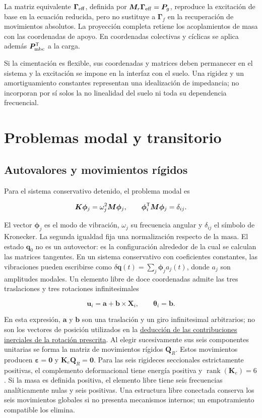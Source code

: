 La matriz equivalente $\bm\Gamma_{\rm eff}$, definida por $\bm M_r\bm\Gamma_{\rm eff}=\bm P_g$, reproduce la excitación de base en la ecuación reducida, pero no sustituye a $\bm\Gamma_f$ en la recuperación de movimientos absolutos. La proyección completa retiene los acoplamientos de masa con las coordenadas de apoyo. En coordenadas colectivas y cíclicas se aplica además $\bm P_{\rm mbc}^\mathsf T$ a la carga.

Si la cimentación es flexible, sus coordenadas y matrices deben permanecer en el sistema y la excitación se impone en la interfaz con el suelo. Una rigidez y un amortiguamiento constantes representan una idealización de impedancia; no incorporan por sí solos la no linealidad del suelo ni toda su dependencia frecuencial.



\section{Problemas modal y transitorio}
\subsection{Autovalores y movimientos rígidos}
Para el sistema conservativo detenido, el problema modal es

\begin{equation}
\bm K\bm\phi_j=\omega_j^2\bm M\bm\phi_j,\qquad
\bm\phi_i^\mathsf T\bm M\bm\phi_j=\delta_{ij}.
\end{equation}

El vector $\bm\phi_j$ es el modo de vibración, $\omega_j$ su frecuencia angular y $\delta_{ij}$ el símbolo de Kronecker. La segunda igualdad fija una normalización respecto de la masa. El estado $\bm q_0$ no es un autovector: es la configuración alrededor de la cual se calculan las matrices tangentes. En un sistema conservativo con coeficientes constantes, las vibraciones pueden escribirse como $\delta\bm q(t)=\sum_j\bm\phi_j a_j(t)$, donde $a_j$ son amplitudes modales.
Un elemento libre de doce coordenadas admite las tres traslaciones y tres rotaciones infinitesimales

\begin{equation}
\bm u_i=\bm a+\bm b\times\bm X_i,\qquad \bm\theta_i=\bm b.
\label{eq:rigid}
\end{equation}

En esta expresión, $\bm a$ y $\bm b$ son una traslación y un giro infinitesimal arbitrarios; no son los vectores de posición utilizados en la \hyperref[sec:giro]{deducción de las contribuciones inerciales de la rotación prescrita}. Al elegir sucesivamente sus seis componentes unitarias se forma la matriz de movimientos rígidos $\bm Q_R$. Estos movimientos producen $\bm\varepsilon=\bm0$ y $\bm K_e\bm Q_R=\bm0$. Para las seis rigideces seccionales estrictamente positivas, el complemento deformacional tiene energía positiva y $\operatorname{rank}(\bm K_e)=6$. Si la masa es definida positiva, el elemento libre tiene seis frecuencias analíticamente nulas y seis positivas. Una estructura libre conectada conserva los seis movimientos globales si no presenta mecanismos internos; un empotramiento compatible los elimina.

